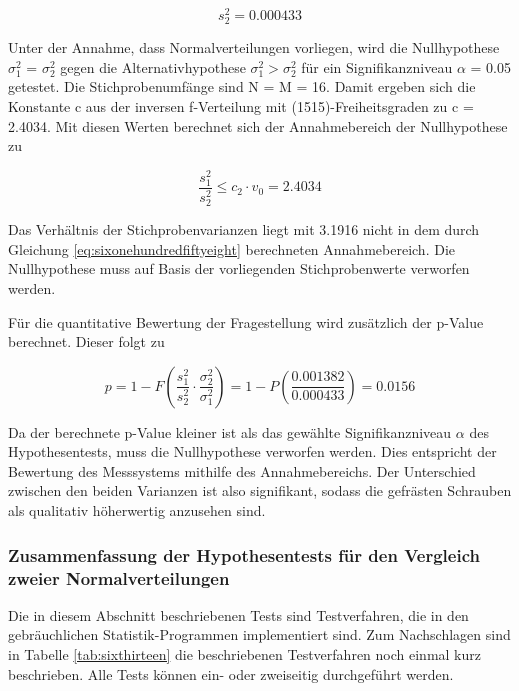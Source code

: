\begin{equation}\label{eq:sixonehundredfiftyseven}
s_{2}^{2} =0.000433
\end{equation}

Unter der Annahme, dass Normalverteilungen vorliegen, wird die Nullhypothese $\sigma_{1}^{2}$ = $\sigma_{2}^{2}$ gegen die Alternativhypothese $\sigma_{1}^{2} > \sigma_{2}^{2}$ f\"{u}r ein Signifikanzniveau $\alpha$ = 0.05 getestet. Die Stichprobenumf\"{a}nge sind N = M = 16. Damit ergeben sich die Konstante c aus der inversen f-Verteilung mit (15{\textbar}15)-Freiheitsgraden zu c = 2.4034. Mit diesen Werten berechnet sich der Annahmebereich der Nullhypothese zu

\begin{equation}\label{eq:sixonehundredfiftyeight}
\dfrac{s_{1}^{2}}{s_{2}^{2}} \le c_{2} \cdot v_{0} = 2.4034
\end{equation}

\noindent Das Verh\"{a}ltnis der Stichprobenvarianzen liegt mit 3.1916 nicht in dem durch Gleichung \eqref{eq:sixonehundredfiftyeight} berechneten Annahmebereich. Die Nullhypothese muss auf Basis der vorliegenden Stichprobenwerte verworfen werden.\newline

\noindent F\"{u}r die quantitative Bewertung der Fragestellung wird zus\"{a}tzlich der p-Value berechnet. Dieser folgt zu

\begin{equation}\label{eq:sixonehundredfiftynine}
p=1-F\left(\dfrac{s_{1}^{2}}{s_{2}^{2}} \cdot \dfrac{\sigma _{2}^{2}}{\sigma _{1}^{2}} \right)=1-P\left(\dfrac{0.001382}{0.000433} \right)= 0.0156
\end{equation}

\noindent Da der berechnete p-Value kleiner ist als das gew\"{a}hlte Signifikanzniveau $\alpha$ des Hypothesentests, muss die Nullhypothese verworfen werden. Dies entspricht der Bewertung des Messsystems mithilfe des Annahmebereichs. Der Unterschied zwischen den beiden Varianzen ist also signifikant, sodass die gefr\"{a}sten Schrauben als qualitativ h\"{o}herwertig anzusehen sind.

\subsubsection{Zusammenfassung der Hypothesentests f\"{u}r den Vergleich zweier Normalverteilungen}

\noindent Die in diesem Abschnitt beschriebenen Tests sind Testverfahren, die in den gebr\"{a}uchlichen Statistik-Programmen implementiert sind. Zum Nachschlagen sind in Tabelle \ref{tab:sixthirteen} die beschriebenen Testverfahren noch einmal kurz beschrieben. Alle Tests k\"{o}nnen ein- oder zweiseitig durchgef\"{u}hrt werden.


